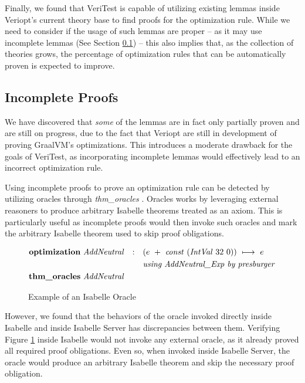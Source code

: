 Finally, we found that VeriTest is capable of utilizing existing lemmas inside Veriopt's current theory base to find proofs for the 
optimization rule. While we need to consider if the usage of such lemmas are proper -- as it may use incomplete lemmas 
(See Section \ref{sec:incompleteProof}) -- this also implies that, as the collection of theories grows, the percentage of optimization 
rules that can be automatically proven is expected to improve.

\subsection{Incomplete Proofs}
\label{sec:incompleteProof}

We have discovered that \emph{some} of the lemmas are in fact only partially proven and are still on progress, due to the fact that 
Veriopt \cite{Term_Graph_Optimizations} are still in development of proving GraalVM's optimizations.
This introduces a moderate drawback for the goals of VeriTest, as incorporating incomplete lemmas would effectively lead to an incorrect 
optimization rule.

Using incomplete proofs to prove an optimization rule can be detected by utilizing oracles through \emph{thm\_oracles} 
\cite[Sec. 5.14]{isabelleIsar}. Oracles works by leveraging external reasoners to produce arbitrary Isabelle theorems treated as an axiom.
This is particularly useful as incomplete proofs would then invoke such oracles and mark the arbitrary Isabelle theorem used to skip proof 
obligations.

\begin{figure}[!htb]
    \centering
    \begin{alignat}{3}
        \text{\textbf{optimization} } & \text{\emph{AddNeutral}} & : \quad & (e~+~\text{\emph{const}}~(\text{\emph{IntVal}}~32~0))~\longmapsto~e & \nonumber \\
        & & & \text{\emph{using AddNeutral\_Exp by presburger}} & \nonumber \\
        \text{\textbf{thm\_oracles} } & \text{\emph{AddNeutral}} & & & \nonumber
    \end{alignat}

    \caption{Example of an Isabelle Oracle}
    \label{fig:isabelleOracle}
\end{figure}

However, we found that the behaviors of the oracle invoked directly inside Isabelle and inside Isabelle Server has discrepancies between them.
Verifying Figure \ref{fig:isabelleOracle} inside Isabelle would not invoke any external oracle, as it already proved all required proof obligations.
Even so, when invoked inside Isabelle Server, the oracle would produce an arbitrary Isabelle theorem and skip the necessary proof obligation.

